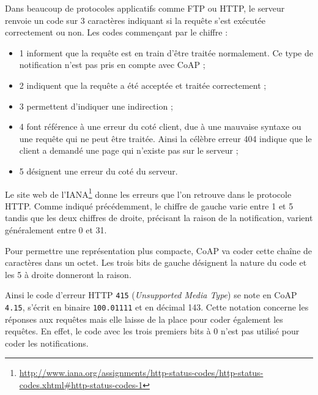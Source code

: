Dans beaucoup de protocoles applicatifs comme FTP ou HTTP, le serveur renvoie un code sur 3 caractères indiquant si la requête s'est exécutée correctement ou non. Les codes commençant par le chiffre :
\begin{itemize}
\item 1 informent que la requête est en train d’être traitée normalement. Ce type de notification n’est pas pris en compte avec CoAP ;
\item 2 indiquent que la requête a été acceptée et traitée correctement ;
\item 3 permettent d’indiquer une indirection ;
\item 4 font référence à une erreur du coté client, due à une mauvaise syntaxe ou une requête qui ne peut être traitée. Ainsi la célèbre erreur 404 indique que le client a demandé une page qui n’existe pas sur le serveur ;
\item 5 désignent une erreur du coté du serveur.
\end{itemize}

         \vspace{1em}

Le site web de l'\ac{IANA}\footnote{\url{http://www.iana.org/assignments/http-status-codes/http-status-codes.xhtml#http-status-codes-1}} donne les erreurs que l’on retrouve dans le protocole HTTP. Comme indiqué précédemment, le chiffre de gauche varie entre 1 et 5 tandis que les deux chiffres de droite, précisant la raison de la notification, varient généralement entre 0 et 31.

         \vspace{1em}

Pour permettre une représentation plus compacte, CoAP va coder cette chaîne de caractères dans un octet. Les trois bits de gauche désignent la nature du code et les 5 à droite donneront la raison. 

         \vspace{1em}

Ainsi le code d’erreur HTTP \texttt{415} (\textit{Unsupported Media Type}) se note en CoAP \texttt{4.15}, s’écrit en binaire \texttt{100.01111} et en décimal 143. Cette notation concerne les réponses aux requêtes mais elle laisse de la place pour coder également les requêtes. En effet, le code avec les trois premiers bits à 0 n’est pas utilisé pour coder les notifications. 

         \vspace{1em}



